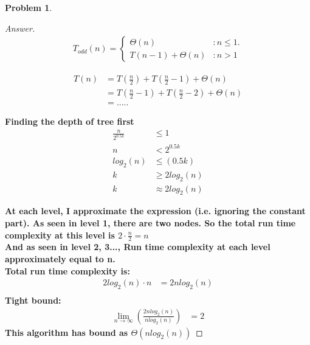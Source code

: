 \documentclass[11pt]{article}
\theoremstyle{definition}
\theoremstyle{definition}
\newtheorem{required}{Problem}
\theoremstyle{definition}
\begin{document}
\begin{required}
\begin{proof}[Answer]
\begin{align*}
T_{odd}(n) = \begin{cases}
\Theta(n)& : n \leq 1.\\
T(n-1) + \Theta(n) & : n > 1 
\end{cases}
\end{align*}

\begin{align*}
T(n) &= T(\frac{n}{2}) + T(\frac{n}{2} -1 ) + \Theta(n)\\
&= T(\frac{n}{2} -1 ) +T(\frac{n}{2} -2 ) + \Theta(n)\\
&= .....
\end{align*}

\textbf{Finding the depth of tree first}
\begin{align*}
\frac{n}{2^{0.5k}} & \leq 1\\
n &< 2^{0.5k}\\
log_2\left(n\right) &\leq (0.5k)\\
k &\geq 2 log_2\left(n\right)\\
k &\approx   2 log_2\left(n\right)
\end{align*}

\textbf{At each level, I approximate the expression (i.e. ignoring the constant part). As seen in level 1, there are two nodes. So the total run time complexity at this level is $2 \cdot \frac{n}{2} = n$\\
And as seen in level 2, 3...,  Run time complexity at each level approximately equal to n.\\}
\textbf{Total run time complexity is:\\}
\begin{align*}
2 log_2\left(n\right) \cdot n &= 2n log_2\left(n\right)\\
\end{align*}
\textbf{Tight bound:\\}
\begin{align*}
\lim _{n\to \infty }\left(\frac{2nlog_2\left(n\right)}{nlog_2\left(n\right)}\right) &= 2
\end{align*}
\textbf{This algorithm has bound as $\Theta(nlog_2\left(n\right))$}
\end{proof}

\end{required}
\end{document}
